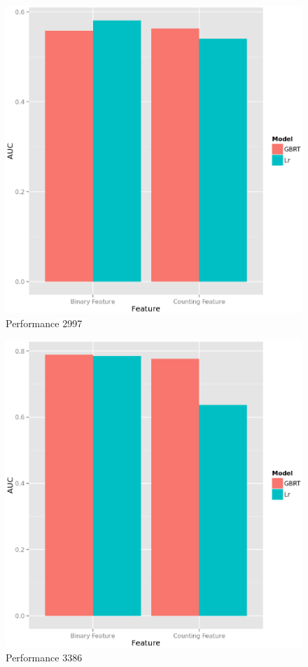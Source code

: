 \documentclass{sig-alternate}
\begin{document}
\begin{figure}[t]
\centering
\includegraphics[width=\columnwidth]{2997.eps}
\caption{Performance 2997}
\label{fig:2997}
\end{figure}

\begin{figure}[t]
\centering
\includegraphics[width=\columnwidth]{3386.eps}
\caption{Performance 3386}
\label{fig:3386}
\end{figure}
\end{document}
